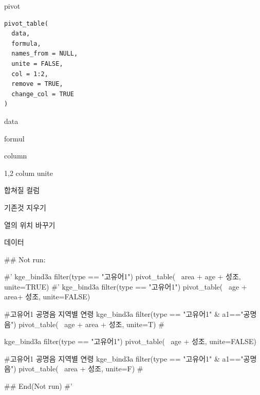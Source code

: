\documentclass[a4paper]{book}
\begin{document}
%
\begin{Description}
pivot
\end{Description}
%
\begin{Usage}
\begin{verbatim}
pivot_table(
  data,
  formula,
  names_from = NULL,
  unite = FALSE,
  col = 1:2,
  remove = TRUE,
  change_col = TRUE
)
\end{verbatim}
\end{Usage}
%
\begin{Arguments}
\begin{ldescription}
\item[\code{data}] data

\item[\code{formula}] formul

\item[\code{names\_from}] column

\item[\code{unite}] 1,2 colum unite

\item[\code{col}] 합쳐질 컬럼

\item[\code{remove}] 기존것 지우기

\item[\code{change\_col}] 열의 위치 바꾸기
\end{ldescription}
\end{Arguments}
%
\begin{Value}
데이터
\end{Value}
%
\begin{Examples}
\begin{ExampleCode}

## Not run: 

#' kge_bind3a %
filter(type == "고유어1")%
  pivot_table(~ area + age + 성조, unite=TRUE)
#'
kge_bind3a %
  filter(type == "고유어1")%
  pivot_table(~  age + area+ 성조, unite=FALSE)

#고유어1 공명음  지역별 연령
kge_bind3a %
  filter(type == "고유어1" & a1=="공명음")%
  pivot_table(~ age + area + 성조, unite=T)  #%



kge_bind3a %
  filter(type == "고유어1")%
  pivot_table(~  age +  성조, unite=FALSE)

#고유어1 공명음  지역별 연령
kge_bind3a %
  filter(type == "고유어1" & a1=="공명음")%
  pivot_table(~  area + 성조, unite=F)  #%


  
## End(Not run)
#'

\end{ExampleCode}
\end{Examples}
\end{document}
